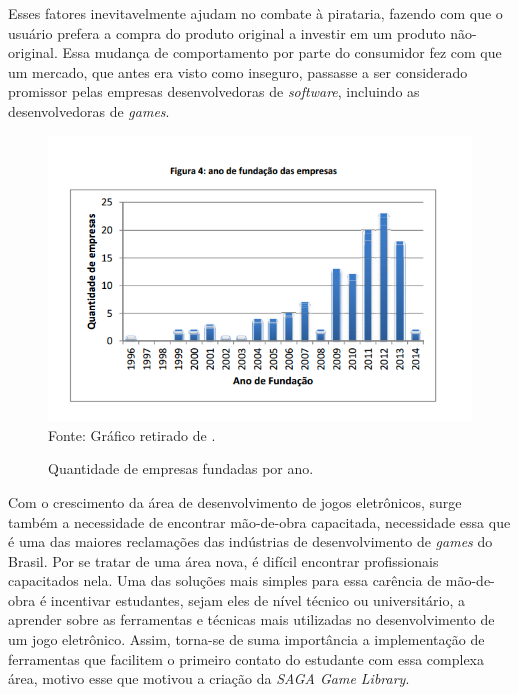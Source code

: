 Esses fatores inevitavelmente ajudam no combate à pirataria, fazendo com que o usuário prefera a compra do produto original a investir em um produto não-original. Essa mudança de comportamento por parte do consumidor fez com que um mercado, que antes era visto como inseguro, passasse a ser considerado promissor pelas empresas desenvolvedoras de \textit{software}, incluindo as desenvolvedoras de \textit{games}.
%
%
%
\begin{figure}[h]
    \centering
    \caption{Quantidade de empresas fundadas por ano.}
    \label{AnoFundacaoEmpresas}
    \includegraphics[scale = 0.80]{Imagens/AnoFundacaoEmpresas.png}
    \\ Fonte: Gráfico retirado de \cite{GEDIGames}.
\end{figure}
%
%
%
\par
Com o crescimento da área de desenvolvimento de jogos eletrônicos, surge também a necessidade de encontrar mão-de-obra capacitada, necessidade essa que é uma das maiores reclamações das indústrias de desenvolvimento de \textit{games} do Brasil. Por se tratar de uma área nova, é difícil encontrar profissionais capacitados nela. Uma das soluções mais simples para essa carência de mão-de-obra é incentivar estudantes, sejam eles de nível técnico ou universitário, a aprender sobre as ferramentas e técnicas mais utilizadas no desenvolvimento de um jogo eletrônico. Assim, torna-se de suma importância a implementação de ferramentas que facilitem o primeiro contato do estudante com essa complexa área, motivo esse que motivou a criação da \textit{SAGA Game Library}.
%
%
